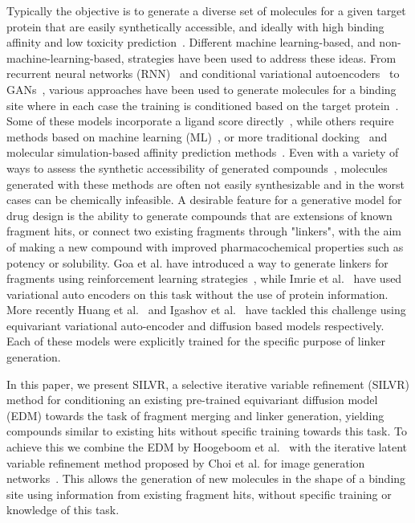 \documentclass[journal=jacsat,manuscript=article]{achemso}
\begin{document}
Typically the objective is to generate a diverse set of molecules for a given target protein that are easily synthetically accessible, and ideally with high binding affinity and low toxicity prediction~\cite{prieto-martinez2019chapter}. Different machine learning-based, and non-machine-learning-based, strategies have been used to address these ideas. From recurrent neural networks (RNN)~\cite{xu2021novo,zhang2022novo} and conditional variational autoencoders~\cite{ragoza2022generating} to GANs~\cite{skalic2019target}, various approaches have been used to generate molecules for a binding site where in each case the training is conditioned based on the target protein~\cite{xie2022advances}. Some of these models incorporate a ligand score directly~\cite{ragoza2022generating}, while others require methods based on machine learning (ML)~\cite{masters2023deep}, or more traditional docking~\cite{fu2018predictive} and molecular simulation-based affinity prediction methods~\cite{mey2016blinded,mey2020best}. Even with a variety of ways to assess the synthetic accessibility of generated compounds~\cite{coley2018scscore, thakkar2021retrosynthetic}, molecules generated with these methods are often not easily synthesizable and in the worst cases can be chemically infeasible. 
A desirable feature for a generative model for drug design is the ability to generate compounds that are extensions of known fragment hits, or connect two existing fragments through "linkers", with the aim of making a new compound with improved pharmacochemical properties such as potency or solubility. Goa et al. have introduced a way to generate linkers for fragments using reinforcement learning strategies~\cite{guo2023linkinvent}, while Imrie et al.~\cite{imrie2020deep} have used variational auto encoders on this task without the use of protein information. More recently Huang et al.~\cite{huang20223dlinker} and Igashov et al.~\cite{igashov2022equivariant} have tackled this challenge using equivariant variational auto-encoder and diffusion based models respectively. Each of these models were explicitly trained for the specific purpose of linker generation.  

In this paper, we present SILVR, a selective iterative variable refinement (SILVR) method for conditioning an existing pre-trained equivariant diffusion model (EDM) towards the task of fragment merging and linker generation, yielding compounds similar to existing hits without specific training towards this task. To achieve this we combine the EDM by Hoogeboom et al.~\cite{hoogeboom2022equivariant} with the iterative latent variable refinement method proposed by Choi et al. for image generation networks~\cite{choi2021ilvr}. This allows the generation of new molecules in the shape of a binding site using information from existing fragment hits, without specific training or knowledge of this task. 
\end{document}
